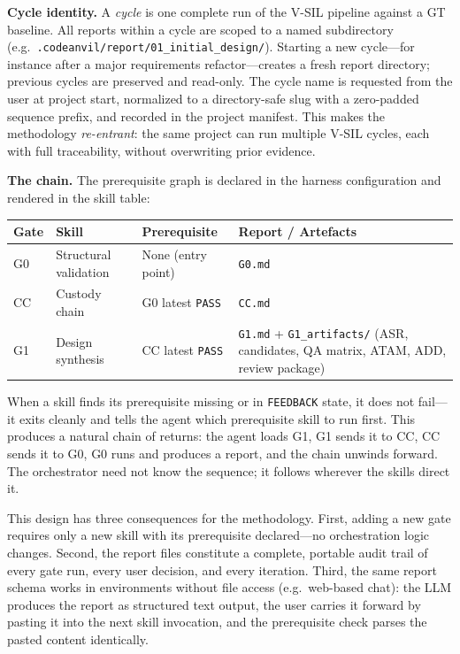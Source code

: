 \documentclass[11pt,a4paper]{article}
\begin{document}
\textbf{Cycle identity.} A \emph{cycle} is one complete run of the V-SIL pipeline against a
GT baseline. All reports within a cycle are scoped to a named subdirectory (e.g.\
\texttt{.codeanvil/report/01\_initial\_design/}). Starting a new cycle---for instance after
a major requirements refactor---creates a fresh report directory; previous cycles are
preserved and read-only. The cycle name is requested from the user at project start,
normalized to a directory-safe slug with a zero-padded sequence prefix, and recorded in the
project manifest. This makes the methodology \emph{re-entrant}: the same project can run
multiple V-SIL cycles, each with full traceability, without overwriting prior evidence.

\textbf{The chain.} The prerequisite graph is declared in the harness configuration and
rendered in the skill table:

\begin{center}
\small
\begin{tabular}{@{}lllp{4.5cm}@{}}
\toprule
\textbf{Gate} & \textbf{Skill} & \textbf{Prerequisite} & \textbf{Report / Artefacts} \\
\midrule
G0 & Structural validation & None (entry point) & \texttt{G0.md} \\
CC & Custody chain & G0 latest \texttt{PASS} & \texttt{CC.md} \\
G1 & Design synthesis & CC latest \texttt{PASS} & \texttt{G1.md} + \texttt{G1\_artifacts/} (ASR, candidates, QA matrix, ATAM, ADD, review package) \\
\bottomrule
\end{tabular}
\end{center}

When a skill finds its prerequisite missing or in \texttt{FEEDBACK} state, it does not
fail---it exits cleanly and tells the agent which prerequisite skill to run first. This
produces a natural chain of returns: the agent loads G1, G1 sends it to CC, CC sends it to
G0, G0 runs and produces a report, and the chain unwinds forward. The orchestrator need not
know the sequence; it follows wherever the skills direct it.

This design has three consequences for the methodology. First, adding a new gate requires
only a new skill with its prerequisite declared---no orchestration logic changes. Second,
the report files constitute a complete, portable audit trail of every gate run, every user
decision, and every iteration. Third, the same report schema works in environments without
file access (e.g.\ web-based chat): the LLM produces the report as structured text output,
the user carries it forward by pasting it into the next skill invocation, and the
prerequisite check parses the pasted content identically.
\end{document}
